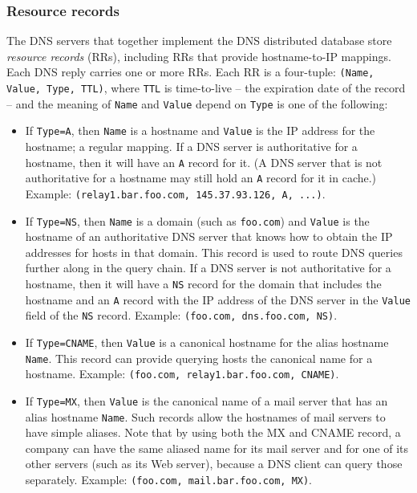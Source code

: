 \documentclass[table, xcdraw]{article}%
\begin{document}
\subsubsection{Resource records} \label{dns:rr}

The DNS servers that together implement the DNS distributed database store \emph{resource records} (RRs), including RRs that provide hostname-to-IP mappings. Each DNS reply carries one or more RRs. Each RR is a four-tuple: \texttt{(Name, Value, Type, TTL)}, where \texttt{TTL} is time-to-live -- the expiration date of the record -- and the meaning of \texttt{Name} and \texttt{Value} depend on \texttt{Type} is one of the following:

\begin{itemize}
    \item If \texttt{Type=A}, then \texttt{Name} is a hostname and \texttt{Value} is the IP address for the hostname; a regular mapping. If a DNS server is authoritative for a hostname, then it will have an \texttt{A} record for it. (A DNS server that is not authoritative for a hostname may still hold an \texttt{A} record for it in cache.) Example: \texttt{(relay1.bar.foo.com, 145.37.93.126, A, ...)}.
    \item If \texttt{Type=NS}, then \texttt{Name} is a domain (such as \texttt{foo.com}) and \texttt{Value} is the hostname of an authoritative DNS server that knows how to obtain the IP addresses for hosts in that domain. This record is used to route DNS queries further along in the query chain. If a DNS server is not authoritative for a hostname, then it will have a \texttt{NS} record for the domain that includes the hostname and an \texttt{A} record with the IP address of the DNS server in the \texttt{Value} field of the \texttt{NS} record. Example: \texttt{(foo.com, dns.foo.com, NS)}.
    \item If \texttt{Type=CNAME}, then \texttt{Value} is a canonical hostname for the alias hostname \texttt{Name}. This record can provide querying hosts the canonical name for a hostname. Example: \texttt{(foo.com, relay1.bar.foo.com, CNAME)}.
    \item If \texttt{Type=MX}, then \texttt{Value} is the canonical name of a mail server that has an alias hostname \texttt{Name}. Such records allow the hostnames of mail servers to have simple aliases. Note that by using both the MX and CNAME record, a company can have the same aliased name for its mail server and for one of its other servers (such as its Web server), because a DNS client can query those separately. Example: \texttt{(foo.com, mail.bar.foo.com, MX)}.
\end{itemize}
\end{document}
